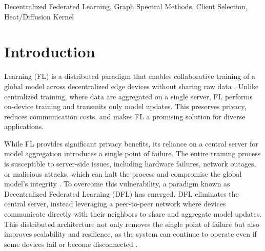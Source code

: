 \documentclass[journal]{IEEEtran}
\begin{document}
\begin{IEEEkeywords}
Decentralized Federated Learning, Graph Spectral Methods, Client Selection, Heat/Diffusion Kernel
\end{IEEEkeywords}


\IEEEpeerreviewmaketitle



\section{Introduction}

 Learning (FL) is a distributed paradigm that enables collaborative training of a global model across decentralized edge devices without sharing raw data \cite{FL}. Unlike centralized training, where data are aggregated on a single server, FL performs on-device training and transmits only model updates. This preserves privacy, reduces communication costs, and makes FL a promising solution for diverse applications. 

While FL provides significant privacy benefits, its reliance on a central server for model aggregation introduces a single point of failure. The entire training process is susceptible to server-side issues, including hardware failures, network outages, or malicious attacks, which can halt the process and compromise the global model's integrity \cite{attack1, attack2}. To overcome this vulnerability, a paradigm known as Decentralized Federated Learning (DFL) has emerged. DFL eliminates the central server, instead leveraging a peer-to-peer network where devices communicate directly with their neighbors to share and aggregate model updates. This distributed architecture not only removes the single point of failure but also improves scalability and resilience, as the system can continue to operate even if some devices fail or become disconnected \cite{decSGDKOLOS, DFLsurvey, DecSGDTop}.
\end{document}
